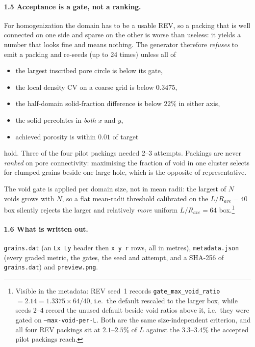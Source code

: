 \documentclass[11pt]{article}
\newcommand{\code}[1]{\texttt{\small #1}}
\begin{document}
\paragraph{1.5 Acceptance is a gate, not a ranking.}
For homogenization the domain has to be a usable REV, so a packing that is
well connected on one side and sparse on the other is worse than useless:
it yields a number that looks fine and means nothing. The generator
therefore \emph{refuses} to emit a packing and re-seeds (up to 24 times)
unless all of
%
\begin{itemize}\itemsep2pt
  \item the largest inscribed pore circle is below its gate,
  \item the local density CV on a coarse grid is below $0.3475$,
  \item the half-domain solid-fraction difference is below $22\%$ in either
        axis,
  \item the solid percolates in \emph{both} $x$ and $y$,
  \item achieved porosity is within $0.01$ of target
\end{itemize}
%
hold. Three of the four pilot packings needed 2--3 attempts. Packings are
never \emph{ranked} on pore connectivity: maximising the fraction of void
in one cluster selects for clumped grains beside one large hole, which is
the opposite of representative.

The void gate is applied per domain size, not in mean radii: the largest of
$N$ voids grows with $N$, so a flat mean-radii threshold calibrated on the
$L/R_{ave}=40$ box silently rejects the larger and relatively \emph{more}
uniform $L/R_{ave}=64$ box.\footnote{Visible in the metadata: REV seed~1
records \code{gate\_max\_void\_ratio} $=2.14 = 1.3375\times 64/40$, i.e.\
the default rescaled to the larger box, while seeds 2--4 record the unused
default beside void ratios above it, i.e.\ they were gated on
\code{--max-void-per-L}. Both are the same size-independent criterion, and
all four REV packings sit at $2.1$--$2.5\%$ of $L$ against the
$3.3$--$3.4\%$ the accepted pilot packings reach.}

\paragraph{1.6 What is written out.}
\code{grains.dat} (an \code{Lx Ly} header then \code{x y r} rows, all in
metres), \code{metadata.json} (every graded metric, the gates, the seed and
attempt, and a SHA-256 of \code{grains.dat}) and \code{preview.png}.
\end{document}
